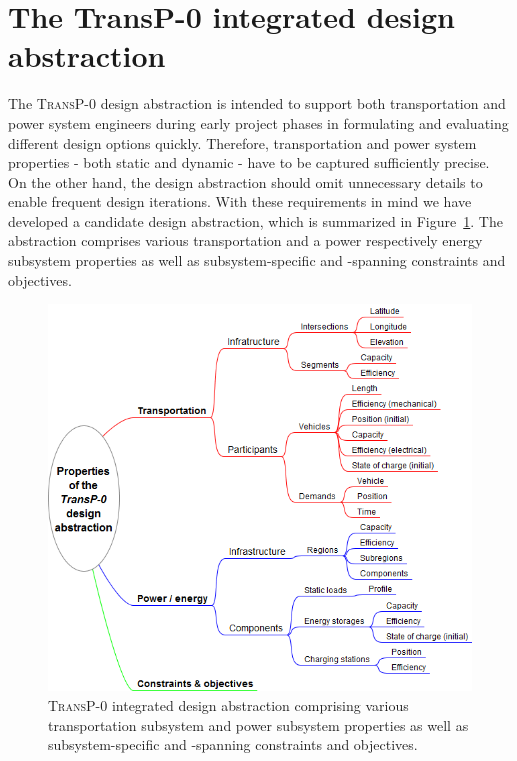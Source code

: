 \section{The \textbf{TransP-0} integrated design abstraction}
\label{proposed_model}

The \textsc{TransP-0} design abstraction is intended to support both transportation and power system engineers during early project phases in formulating and evaluating different design options quickly. Therefore, transportation and power system properties - both static and dynamic - have to be captured sufficiently precise. On the other hand, the design abstraction should omit unnecessary details to enable frequent design iterations. With these requirements in mind we have developed a candidate design abstraction, which is summarized in Figure~\ref{system_design}. The abstraction comprises various transportation and a power respectively energy subsystem properties as well as subsystem-specific and -spanning constraints and objectives.

\begin{figure}[h!]
	\includegraphics[width=\columnwidth]{./gfx/system_design.png}
	\caption{\textsc{TransP-0} integrated design abstraction comprising various transportation subsystem and power subsystem properties as well as subsystem-specific and -spanning constraints and objectives.}
	\label{system_design}
\end{figure}


